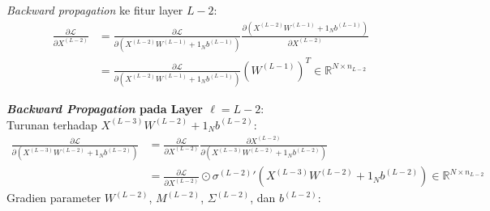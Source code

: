 \documentclass[11pt,a4paper]{article}
\def\mathbf#1{#1}%
\theoremstyle{plain}
\theoremstyle{definition}
\theoremstyle{remark}
\begin{document}
\textit{Backward propagation} ke fitur layer $L-2$:
\begin{align}
    \frac{\partial \mathcal{L}}{\partial X^{(L-2)}} &= \frac{\partial \mathcal{L}}{\partial \left( X^{(L-2)} W^{(L-1)} + \mathbf{1}_N \mathbf{b}^{(L-1)} \right)} \frac{\partial \left( X^{(L-2)} W^{(L-1)} + \mathbf{1}_N \mathbf{b}^{(L-1)} \right)}{\partial X^{(L-2)}} \nonumber \\
    &= \frac{\partial \mathcal{L}}{\partial \left( X^{(L-2)} W^{(L-1)} + \mathbf{1}_N \mathbf{b}^{(L-1)} \right)} \left( W^{(L-1)} \right)^T \in \mathbb{R}^{N \times n_{L-2}}
\end{align}

\noindent \textbf{\textit{Backward Propagation} pada Layer $\ell = L-2$}: \\
Turunan terhadap $X^{(L-3)} W^{(L-2)} + \mathbf{1}_N \mathbf{b}^{(L-2)}$:
\begin{align}
    \frac{\partial \mathcal{L}}{\partial \left( X^{(L-3)} W^{(L-2)} + \mathbf{1}_N \mathbf{b}^{(L-2)} \right)} &= \frac{\partial \mathcal{L}}{\partial X^{(L-2)}} \frac{\partial X^{(L-2)}}{\partial \left( X^{(L-3)} W^{(L-2)} + \mathbf{1}_N \mathbf{b}^{(L-2)} \right)} \nonumber \\
    &= \frac{\partial \mathcal{L}}{\partial X^{(L-2)}} \odot {\sigma^{(L-2)}}'\!\left( X^{(L-3)} W^{(L-2)} + \mathbf{1}_N \mathbf{b}^{(L-2)} \right) \in \mathbb{R}^{N \times n_{L-2}}
\end{align}
Gradien parameter $W^{(L-2)}$, $M^{(L-2)}$, $\Sigma^{(L-2)}$, dan $\mathbf{b}^{(L-2)}$:
\end{document}
